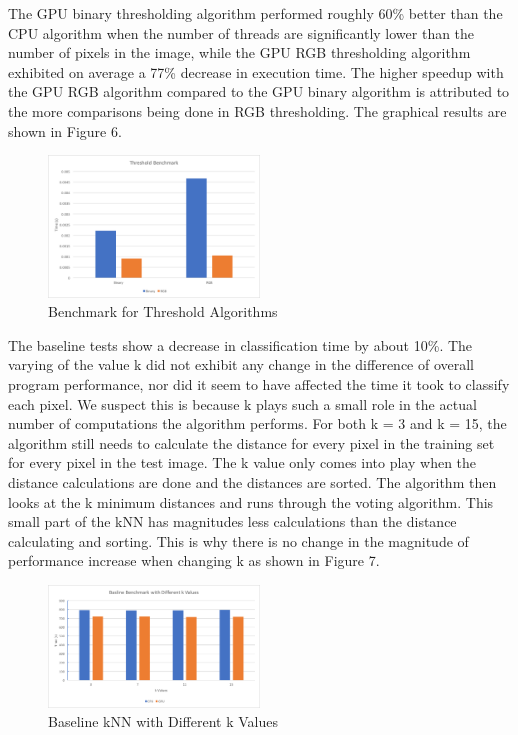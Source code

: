 \documentclass[conference]{IEEEtran}
\begin{document}
The GPU binary thresholding algorithm performed roughly 60\% better than the CPU algorithm when the number of threads are significantly lower than the number of pixels in the image, while the GPU RGB thresholding algorithm exhibited on average a 77\% decrease in execution time. The higher speedup with the GPU RGB algorithm compared to the GPU binary algorithm is attributed to the more comparisons being done in RGB thresholding. The graphical results are shown in Figure 6.

\begin{figure}[h]
\centering
\includegraphics[width=0.5\textwidth]{threshBench}
\caption{Benchmark for Threshold Algorithms}
\end{figure}

The baseline tests show a decrease in classification time by about 10\%. The varying of the value k did not exhibit any change in the difference of overall program performance, nor did it seem to have affected the time it took to classify each pixel. We suspect this is because k plays such a small role in the actual number of computations the algorithm performs. For both k = 3 and k = 15, the algorithm still needs to calculate the distance for every pixel in the training set for every pixel in the test image. The k value only comes into play when the distance calculations are done and the distances are sorted. The algorithm then looks at the k minimum distances and runs through the voting algorithm. This small part of the kNN has magnitudes less calculations than the distance calculating and sorting. This is why there is no change in the magnitude of performance increase when changing k as shown in Figure 7.



\begin{figure}[h]
\centering
\includegraphics[width=0.5\textwidth]{diffk}
\caption{Baseline kNN with Different k Values}
\end{figure}
\end{document}
